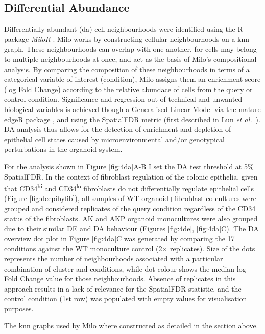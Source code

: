 \subsection{Differential Abundance}

Differentially abundant (\acrshort{da}) cell neighbourhoods were identified using the R package \textit{MiloR} \cite{dann_differential_2022}. Milo works by constructing cellular neighbourhoods on a \acrshort{knn} graph. These neighbourhoods can overlap with one another, for cells may belong to multiple neighbourhoods at once, and act as the basis of Milo's compositional analysis. By comparing the composition of these neighbourhoods in terms of a categorical variable of interest (condition), Milo assigns them an enrichment score (log Fold Change) according to the relative abundace of cells from the query or control condition. Significance and regression out of technical and unwanted biological variables is achieved though a Generalised Linear Model via the mature edgeR package \cite{robinson_edger_2010}, and using the SpatialFDR metric (first described in Lun \emph{et al.}~\cite{lun_testing_2017}).
DA analysis thus allows for the detection of enrichment and depletion of epithelial cell states caused by microenvironmental and/or genotypical perturbations in the organoid system. 

For the analysis shown in Figure \ref{fig:4da}A-B I set the DA test threshold at 5\% SpatialFDR. In the context of fibroblast regulation of the colonic epithelia, given that CD34\textsuperscript{hi} and CD34\textsuperscript{lo} fibroblasts do not differentially regulate epithelial cells (Figure \ref{fig:deepibyfib}), all samples of WT organoid+fibroblast co-cultures were grouped and considered replicates of the query condition regardless of the CD34 status of the fibroblasts. AK and AKP organoid monocultures were also grouped due to their similar DE and DA behaviour (Figures \ref{fig:4de}, \ref{fig:4da}C).
The DA overview dot plot in Figure \ref{fig:4da}C was generated by comparing the 17 conditions against the WT monoculture control (2$\times$ replicates). Size of the dots represents the number of neighbourhoods associated with a particular combination of cluster and conditions, while dot colour shows the median log Fold Change value for those neighbourhoods. Absence of replicates in this approach results in a lack of relevance for the SpatialFDR statistic, and the control condition (1st row) was populated with empty values for visualisation purposes. 

The \acrshort{knn} graphs used by Milo where constructed as detailed in the section above.

